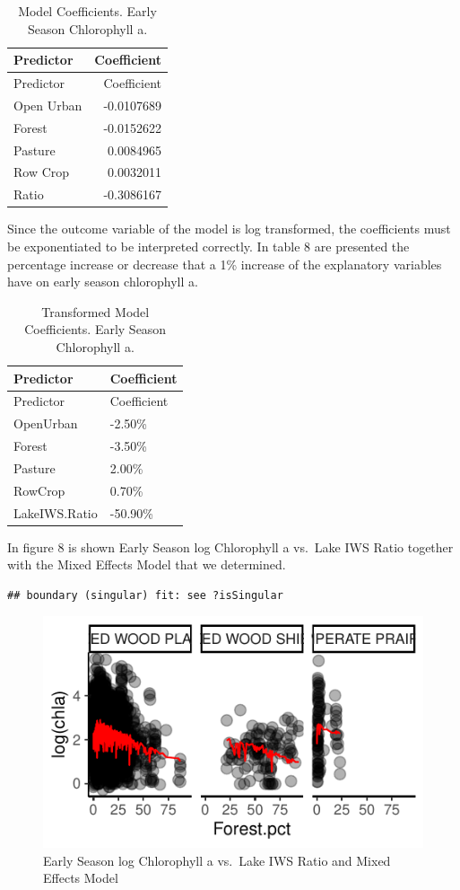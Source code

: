 \documentclass[12pt,]{article}
\begin{document}
\begin{longtable}[]{@{}lr@{}}
\caption{Model Coefficients. Early Season Chlorophyll a.}\tabularnewline
\toprule
Predictor & Coefficient\tabularnewline
\midrule
\endfirsthead
\toprule
Predictor & Coefficient\tabularnewline
\midrule
\endhead
Open Urban & -0.0107689\tabularnewline
Forest & -0.0152622\tabularnewline
Pasture & 0.0084965\tabularnewline
Row Crop & 0.0032011\tabularnewline
Ratio & -0.3086167\tabularnewline
\bottomrule
\end{longtable}

Since the outcome variable of the model is log transformed, the
coefficients must be exponentiated to be interpreted correctly. In table
8 are presented the percentage increase or decrease that a 1\% increase
of the explanatory variables have on early season chlorophyll a.

\begin{longtable}[]{@{}ll@{}}
\caption{Transformed Model Coefficients. Early Season Chlorophyll
a.}\tabularnewline
\toprule
Predictor & Coefficient\tabularnewline
\midrule
\endfirsthead
\toprule
Predictor & Coefficient\tabularnewline
\midrule
\endhead
OpenUrban & -2.50\%\tabularnewline
Forest & -3.50\%\tabularnewline
Pasture & 2.00\%\tabularnewline
RowCrop & 0.70\%\tabularnewline
LakeIWS.Ratio & -50.90\%\tabularnewline
\bottomrule
\end{longtable}

In figure 8 is shown Early Season log Chlorophyll a vs.~Lake IWS Ratio
together with the Mixed Effects Model that we determined.

\begin{verbatim}
## boundary (singular) fit: see ?isSingular
\end{verbatim}

\begin{figure}
\centering
\includegraphics{Bollt_Greif_Raby_Roth_Project_Final_files/figure-latex/unnamed-chunk-19-1.pdf}
\caption{Early Season log Chlorophyll a vs.~Lake IWS Ratio and Mixed
Effects Model}
\end{figure}
\end{document}
